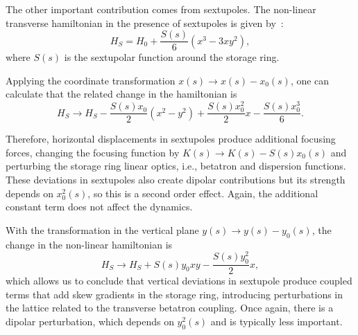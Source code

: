The other important contribution comes from sextupoles. The non-linear transverse hamiltonian in the presence of sextupoles is given by~\cite{wiedemann2007physics}:
\begin{equation}
    H_S = H_0 + \dfrac{S(s)}{6}\left(x^3 - 3xy^2\right),
\end{equation}
where $S(s)$ is the sextupolar function around the storage ring.

Applying the coordinate transformation $x(s) \rightarrow x(s) - x_0(s)$, one can calculate that the related change in the hamiltonian is
\begin{equation}
    H_S \rightarrow H_S - \dfrac{S(s)x_0}{2}\left(x^2 - y^2\right) + \dfrac{S(s)x_0^2}{2}x - \dfrac{S(s)x_0^3}{6}.
\end{equation}

Therefore, horizontal displacements in sextupoles produce additional focusing forces, changing the focusing function by $K(s) \rightarrow K(s) - S(s)x_0(s)$ and perturbing the storage ring linear optics, i.e., betatron and dispersion functions. These deviations in sextupoles also create dipolar contributions but its strength depends on $x^2_0(s)$, so this is a second order effect. Again, the additional constant term does not affect the dynamics.

With the transformation in the vertical plane $y(s) \rightarrow y(s) - y_0(s)$, the change in the non-linear hamiltonian is
\begin{equation}
    H_S \rightarrow H_S + S(s)y_0 xy - \dfrac{S(s)y_0^2}{2}x,
\end{equation}
which allows us to conclude that vertical deviations in sextupole produce coupled terms that add skew gradients in the storage ring, introducing perturbations in the lattice related to the transverse betatron coupling. Once again, there is a dipolar perturbation, which depends on $y^2_0(s)$ and is typically less important.

